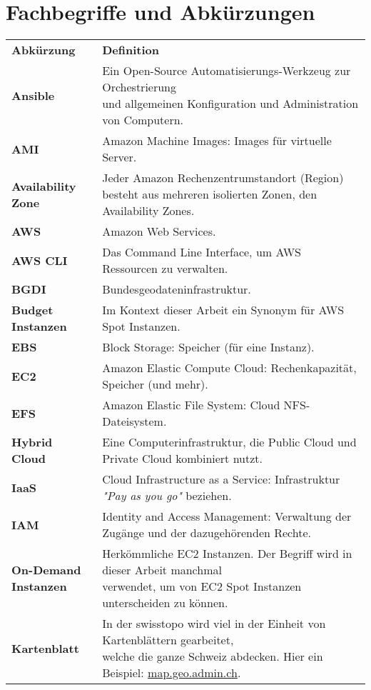 \section{Fachbegriffe und Abkürzungen}
\begin{table}[!htbp]
\begin{tabular}{p{}p{}}
    \textbf{Abkürzung} & \textbf{Definition}\\
    \textbf{Ansible} & \makecell[l]{Ein Open-Source Automatisierungs-Werkzeug zur Orchestrierung\\ und allgemeinen Konfiguration und Administration von Computern.}\\
    \textbf{AMI} & Amazon Machine Images: Images für virtuelle Server.\\
    \textbf{Availability Zone} & \makecell[l]{Jeder Amazon Rechenzentrumstandort (Region)\\
    besteht aus mehreren isolierten Zonen, den Availability Zones.}\\
    \textbf{AWS} & Amazon Web Services.\\
    \textbf{AWS CLI} & Das Command Line Interface, um AWS Ressourcen zu verwalten.\\
    \textbf{BGDI} & Bundesgeodateninfrastruktur.\\
    \textbf{Budget Instanzen} & Im Kontext dieser Arbeit ein Synonym für AWS Spot Instanzen.\\
    \textbf{EBS} & Block Storage: Speicher (für eine Instanz).\\
    \textbf{EC2} & Amazon Elastic Compute Cloud: Rechenkapazität, Speicher (und mehr).\\
    \textbf{EFS} & Amazon Elastic File System: Cloud NFS-Dateisystem.\\
    \textbf{Hybrid Cloud} & Eine Computerinfrastruktur, die Public Cloud und Private Cloud kombiniert nutzt.\\
    \textbf{IaaS} & Cloud Infrastructure as a Service: Infrastruktur \emph{"Pay as you go"} beziehen.\\
    \textbf{IAM} & Identity and Access Management: Verwaltung der Zugänge und der dazugehörenden Rechte.\\
    \makecell[l]{\textbf{On-Demand}\\ \textbf{Instanzen}} & \makecell[l]{Herkömmliche EC2 Instanzen. Der Begriff wird in dieser Arbeit manchmal\\ verwendet, um von EC2 Spot Instanzen unterscheiden zu können.}\\
    \textbf{Kartenblatt} & \makecell[l]{In der swisstopo wird viel in der Einheit von Kartenblättern gearbeitet,\\ welche die ganze Schweiz abdecken. Hier ein Beispiel: \href{https://s.geo.admin.ch/8b5f3f6721}{map.geo.admin.ch}.}\\

\end{tabular}
\end{table}
